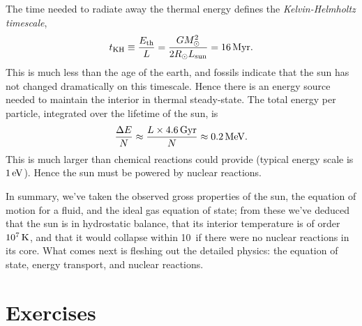 The time needed to radiate away the thermal energy defines the \emph{Kelvin-Helmholtz timescale},
\begin{equation}\label{e.K-H}
t_{\mathrm{KH}} \equiv \frac{E_{\mathrm{th}}}{L} = \frac{GM_\odot^{2}}{2R_{\odot} L_{\mathrm{sun}}} = 16 \,\mathrm{M}\mathrm{yr}.
\end{equation}
This is much less than the age of the earth, and fossils indicate that the sun has not changed dramatically on this timescale.  Hence there is an energy source needed to maintain the interior in thermal steady-state. The total energy per particle, integrated over the lifetime of the sun, is
\[ \frac{\Delta E}{N} \approx \frac{L\times 4.6\,\mathrm{G}\mathrm{yr}}{N} \approx 0.2\,\mathrm{M}\mathrm{eV}. \]
This is much larger than chemical reactions could provide (typical energy scale is $1\,\mathrm{eV}$). Hence the sun must be powered by nuclear reactions.

In summary, we've taken the observed gross properties of the sun, the equation of motion for a fluid, and the ideal gas equation of state; from these we've deduced that the sun is in hydrostatic balance, that its interior temperature is of order $10^{7}\,\mathrm{K}$, and that it would collapse within 10\nsp\Mega\yr\ if there were no nuclear reactions in its core.  What comes next is fleshing out the detailed physics: the equation of state, energy transport, and nuclear reactions.

\section{Exercises}\label{s.intro-exercises}

